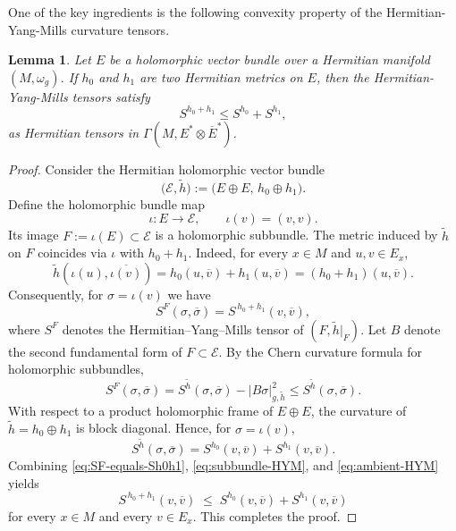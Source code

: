 \documentclass[12pt, reqno]{amsart}
\theoremstyle{plain}
\newtheorem{lemma}[thm]{Lemma}
\theoremstyle{definition}
\newcommand{\bproof}{\begin{proof}}
\newcommand{\eproof}{\end{proof}}
\newcommand{\elemma}{\end{lemma}}
\newcommand{\blemma}{\begin{lemma}}
\renewcommand{\bar}{\overline}
\newcommand{\beq}{\begin{equation}}
\newcommand{\eeq}{\end{equation}}
\renewcommand{\tilde}{\widetilde}
\newcommand{\ts}{\otimes}
\renewcommand{\>}{\rightarrow}
\renewcommand{\>}{\rightarrow}
\newcommand{\om}{\omega}
\renewcommand{\bar}{\overline}
\renewcommand{\tilde}{\widetilde}
\numberwithin{equation}{section} %
\begin{document}
\noindent One of the key ingredients is the following convexity property of the Hermitian-Yang-Mills curvature tensors.
\blemma \label{convex}
Let $E$ be a holomorphic vector bundle over a Hermitian manifold $(M,\om_g)$.
If $h_0$ and $h_1$ are two Hermitian metrics on $E$, then the Hermitian-Yang-Mills tensors satisfy
\beq
S^{h_0+h_1}\le  S^{h_0}+ S^{h_1},
\eeq
as Hermitian tensors in $\Gamma(M,E^*\ts \bar E^*)$.
\elemma
\bproof Consider the Hermitian holomorphic vector bundle
\begin{equation}
\bigl(\mathcal{E},\tilde{h}\bigr)
:=\bigl(E\oplus E,\,h_{0}\oplus h_{1}\bigr).
\end{equation}
Define the holomorphic bundle map
\begin{equation}
\iota\colon E\longrightarrow \mathcal{E},
\qquad
\iota(v)=(v,v).
\end{equation}
Its image $F:=\iota(E)\subset\mathcal{E}$ is a holomorphic subbundle.
The metric induced by $\tilde{h}$ on $F$ coincides via $\iota$ with
$h_{0}+h_{1}$.  Indeed, for every $x\in M$ and $u,v\in E_{x}$,
\begin{equation}
\tilde{h}\left(\iota(u),\overline{\iota(v)}\right)
= h_{0}\left(u,\bar v\right)+h_{1}\left(u,\bar v\right)
= (h_{0}+h_{1})\left(u,\bar v\right).
\end{equation}
Consequently, for $\sigma=\iota(v)$ we have
\begin{equation}
S^{F}(\sigma,\bar{\sigma})
= S^{\,h_{0}+h_{1}}(v,\bar{v}),
\label{eq:SF-equals-Sh0h1}
\end{equation}
where $S^{F}$ denotes the  Hermitian--Yang--Mills tensor of
$(F,\tilde{h}|_{F})$.
Let $B$ denote the second fundamental form of $F\subset\mathcal{E}$.
By the Chern curvature formula for holomorphic subbundles,
\begin{equation}
S^{F}(\sigma,\bar{\sigma})
= S^{\tilde{h}}(\sigma,\bar{\sigma})
- |B\sigma|^{2}_{g,\tilde{h}}
\le S^{\tilde{h}}(\sigma,\bar{\sigma}).
\label{eq:subbundle-HYM}
\end{equation}
With respect to a product holomorphic frame of $E\oplus E$,
the curvature of $\tilde{h}=h_{0}\oplus h_{1}$ is block diagonal.
Hence, for $\sigma=\iota(v)$,
\begin{equation}
S^{\tilde{h}}(\sigma,\bar{\sigma})
= S^{h_{0}}(v,\bar{v})+S^{h_{1}}(v,\bar{v}).
\label{eq:ambient-HYM}
\end{equation}
Combining \eqref{eq:SF-equals-Sh0h1},
\eqref{eq:subbundle-HYM}, and \eqref{eq:ambient-HYM} yields
\begin{equation}
S^{\,h_{0}+h_{1}}(v,\bar{v})
\;\le\;
S^{h_{0}}(v,\bar{v})+S^{h_{1}}(v,\bar{v})
\end{equation}
for every $x\in M$ and every $v\in E_x$.  This completes the proof.\eproof
\end{document}
